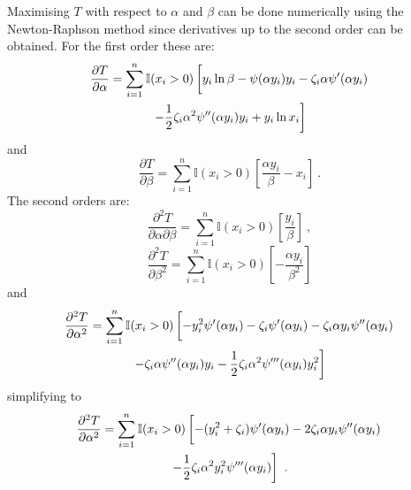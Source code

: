 \documentclass[12pt, a4paper]{memoir}
\begin{document}
Maximising $T$ with respect to $\alpha$ and $\beta$ can be done numerically using the Newton-Raphson method since derivatives up to the second order can be obtained. For the first order these are:
\begin{multline}
\frac{\partial T}{\partial \alpha} = \sum_{i=1}^n\mathbb{I}(x_i>0)\left[
	y_i\ln\beta -\psi(\alpha y_i)y_i-\zeta_i\alpha\psi'(\alpha y_i)
	\vphantom{\frac{1}{1}}\right.\\\left.
	- \frac{1}{2}\zeta_i\alpha^2\psi''(\alpha y_i)y_i + y_i\ln x_i
\right]
\end{multline}
and
\begin{equation}
\frac{\partial T}{\partial \beta} = \sum_{i=1}^n\mathbb{I}(x_i>0)\left[
\frac{\alpha y_i}{\beta}-x_i
\right] \ .
\end{equation}
The second orders are:
\begin{equation}
\frac{\partial^2 T}{\partial \alpha \partial \beta} =
\sum_{i=1}^n \mathbb{I}(x_i>0)\left[\frac{y_i}{\beta}\right] \ ,
\end{equation}
\begin{equation}
\frac{\partial^2 T}{\partial \beta^2} = \sum_{i=1}^n\mathbb{I}(x_i>0)\left[-\frac{\alpha y_i}{\beta^2}
\right]
\end{equation}
and
\begin{multline*}
\frac{\partial^2 T}{\partial \alpha^2} =  \sum_{i=1}^n\mathbb{I}(x_i>0)\left[
	-y_i^2\psi'(\alpha y_i) - \zeta_i\psi'(\alpha y_i) - \zeta_i\alpha y_i\psi''(\alpha y_i)
	\vphantom{\frac{1}{2}}\right.\\\left.	
	- \zeta_i\alpha\psi''(\alpha y_i)y_i
	-\frac{1}{2}\zeta_i\alpha^2\psi'''(\alpha y_i)y_i^2
\right]
\end{multline*}
simplifying to
\begin{multline}
\frac{\partial^2 T}{\partial \alpha^2} =  \sum_{i=1}^n\mathbb{I}(x_i>0)\left[
	-(y_i^2+\zeta_i)\psi'(\alpha y_i) - 2\zeta_i\alpha y_i\psi''(\alpha y_i)
	\vphantom{\frac{1}{2}}\right.\\\left.	
	-\frac{1}{2}\zeta_i\alpha^2y_i^2\psi'''(\alpha y_i)
\right] \ .
\end{multline}
\end{document}
